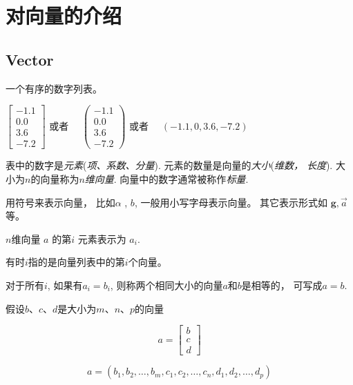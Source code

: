 \chapter{对向量的介绍}

\section{Vector}

\begin{definition}[Vector]
    一个有序的数字列表。

    $  \left[\begin{array}{c}-1.1 \\ 0.0 \\ 3.6 \\ -7.2\end{array}\right]  $ 或者 $  \quad\left(\begin{array}{c}-1.1 \\ 0.0 \\ 3.6 \\ -7.2\end{array}\right)  $ 或者 $  \quad(-1.1,0,3.6,-7.2)  $
\end{definition}

表中的数字是\textit{元素}(\textit{项、系数、分量}). 元素的数量是向量的\textit{大小}(\textit{维数， 长度}). 大小为$n$的向量称为\textit{$n$维向量}. 
向量中的数字通常被称作\textit{标量}. 

用符号来表示向量， 比如$\alpha$ , $b$, 一般用小写字母表示向量。 其它表示形式如 $\boldsymbol{g}, \vec{a}$等。

\begin{definition}[$n$维向量 $  a  $ 的第 $  i  $ 元素]
    $n$维向量 $  a  $ 的第$  i  $ 元素表示为 $  a_{i}  $.

    有时$i$指的是向量列表中的第$i$个向量。
\end{definition}

\begin{definition}[$a=b$]
    对于所有$i$, 如果有$a_i = b_i$, 则称两个相同大小的向量$a$和$b$是相等的， 可写成$a = b$.
\end{definition}

\begin{definition}
    假设$b$、$c$、$d$是大小为$m$、$n$、$p$的向量
    
    \begin{equation} a=\left[\begin{array}{l}b \\ c \\ d\end{array}\right] \end{equation}

    \begin{equation} a=\left(b_{1}, b_{2}, \ldots, b_{m}, c_{1}, c_{2}, \ldots, c_{n}, d_{1}, d_{2}, \ldots, d_{p}\right) \end{equation}
\end{definition}

